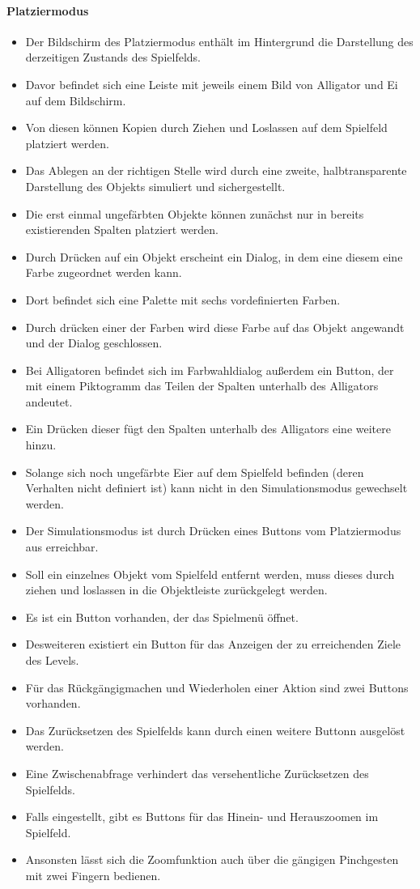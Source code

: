 \paragraph{Platziermodus}
\begin{itemize}
\item Der Bildschirm des Platziermodus enthält im Hintergrund die Darstellung
des derzeitigen Zustands des Spielfelds.
\item Davor befindet sich eine Leiste mit jeweils einem Bild von Alligator und Ei auf dem Bildschirm.
\item Von diesen können Kopien durch Ziehen und Loslassen auf dem Spielfeld platziert werden. 
\item Das Ablegen an der richtigen Stelle wird durch eine zweite, 
halbtransparente Darstellung des Objekts simuliert und sichergestellt. 
\item Die erst einmal ungefärbten Objekte können zunächst nur in bereits 
existierenden Spalten platziert werden.
\item  Durch Drücken auf ein Objekt erscheint 
ein Dialog, in dem eine diesem eine Farbe zugeordnet werden kann.
\item Dort befindet sich eine Palette mit sechs vordefinierten Farben.
\item Durch drücken einer der Farben wird diese Farbe auf das Objekt angewandt und der Dialog geschlossen.
\item Bei Alligatoren befindet sich im Farbwahldialog außerdem ein Button, der mit einem
Piktogramm das Teilen der Spalten unterhalb des Alligators andeutet.
\item Ein Drücken dieser fügt den Spalten unterhalb des Alligators eine weitere hinzu.
\item Solange sich noch ungefärbte Eier auf dem Spielfeld befinden (deren Verhalten
nicht definiert ist) kann nicht in den Simulationsmodus gewechselt werden.
\item Der Simulationsmodus ist durch Drücken eines Buttons vom Platziermodus
aus erreichbar.
\item Soll ein einzelnes Objekt vom Spielfeld entfernt werden, muss dieses durch ziehen und loslassen
in die Objektleiste zurückgelegt werden.
\item Es ist ein Button vorhanden, der das Spielmenü öffnet.
\item Desweiteren existiert ein Button für das Anzeigen der zu erreichenden Ziele des Levels.
\item Für das Rückgängigmachen und Wiederholen einer Aktion sind zwei Buttons vorhanden.
\item Das Zurücksetzen des Spielfelds kann durch einen weitere Buttonn ausgelöst werden.
\item Eine Zwischenabfrage verhindert das versehentliche Zurücksetzen des Spielfelds.
\item Falls eingestellt, gibt es Buttons für das Hinein- und Herauszoomen im Spielfeld.
\item Ansonsten lässt sich die Zoomfunktion auch über die gängigen Pinchgesten mit zwei Fingern bedienen.
\end{itemize}

